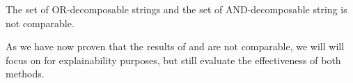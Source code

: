 \begin{corollary}
	The set of OR-decomposable strings and the set of AND-decomposable string is not comparable.
\end{corollary}

As we have now proven that the results of \andDecomp and \orDecomp are not comparable, we will will focus on \orDecomp for explainability purposes, but still evaluate the effectiveness of both methods.



